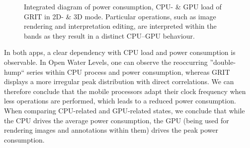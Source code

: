\documentclass[review]{elsarticle}
\begin{document}
\begin{figure}[htbp!]
\begin{center}
	 	\begin{minipage}{\columnwidth}
	 		\centering
	 	\end{minipage}
	 	\begin{minipage}{\columnwidth}
	 		\centering
	 	\end{minipage}
	\caption{Integrated diagram of power consumption, CPU- \& GPU load of GRIT in 2D- \& 3D mode. Particular operations, such as image rendering and interpretation editing, are interpreted within the bands as they result in a distinct \gls{CPU}--\gls{GPU} behaviour.}
	\label{fig:power:Power_CPU_GPU}
\end{center}
\end{figure}

In both apps, a clear dependency with \gls{CPU} load and power consumption is observable. In Open Water Levels, one can observe the reoccurring ''double-hump`` series within CPU process and power consumption, whereas \gls{GRIT} displays a more irregular peak distribution with direct correlations. We can therefore conclude that the mobile processors adapt their clock frequency when less operations are performed, which leads to a reduced power consumption. When comparing \gls{CPU}-related and \gls{GPU}-related states, we conclude that while the \gls{CPU} drives the average power consumption, the GPU (being used for rendering images and annotations within them) drives the peak power consumption.
\end{document}
